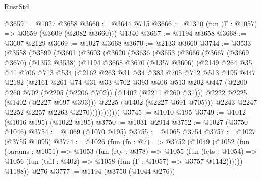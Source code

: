 \begin{lexlean}{RustStd}
\begin{coremodule}
@3659 := @1027 @3658
@3660 := @3644 @715
@3666 := @1310 (fun (Γ : @1057) => @3659 (@3609 (@2082 @3660))) @1340
@3667 := @1194 @3658
@3668 := @3607 @2129
@3669 := @1027 @3668
@3670 := @2133 @3660
@3744 := @3533
    (@3558
      (@3599
        (@3601
          (@3603
            (@3620
              (@3636
                (@3653
                  (@3666
                    (@3667
                      (@3669 @3670)
                      (@1352 @3538)
                      (@1194
                        @3668
                        @3670
                        (@1357 @3606)
                        (@2149
                          @264
                          @35
                          @41
                          @706
                          @713
                          @534
                          (@2162
                            @263
                            @31
                            @34
                            @383
                            @705
                            @712
                            @513
                            @195
                            @447
                            @2182
                            (@2161
                              @261
                              @74
                              @31
                              @33
                              @702
                              @393
                              @406
                              @513
                              @202
                              @447
                              (@2200 @260 @702 (@2205 (@2206 @702)) (@1402 (@2211 @260 @31)))
                              @2222
                              @2225
                              (@1402 (@2227 @697 @393)))
                            @2225
                            (@1402 (@2227 @691 @705)))
                          @2243
                          @2247
                          @2252
                          @2257
                          @2263
                          @2270)))))))))))
@3745 := @1010 @195
@3749 := @1012 (@1016 @195) (@1022 @195)
@3750 := @1031 @2914
@3752 := @1027 (@3750 @1046)
@3754 := @1069 (@1070 @195)
@3755 := @1065 @3754
@3757 := @1027 (@3755 @1095)
@3774 := @1026
    (fun (fn : @7) =>
    @3752
      (@1049
        (@1052
          (fun (params : @1051) =>
          @1053
            (fun (rty : @378) =>
            @1055
              (fun (lets : @1054) =>
              @1056 (fun (tail : @402) => @1058 (fun (Γ : @1057) => @3757 @1142))))))
        @1188))
    @276
@3777 := @1194 (@3750 (@1044 @276))

\end{coremodule}
\end{lexlean}
